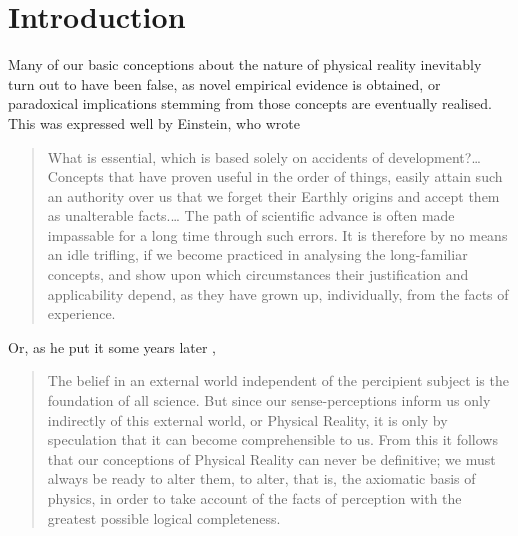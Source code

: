 \documentclass[11pt]{article}
\begin{document}
\section{Introduction \label{sec_I}}
Many of our basic conceptions about the nature of physical reality inevitably turn out to have been false, as novel empirical evidence is obtained, or paradoxical implications stemming from those concepts are eventually realised. This was expressed well by Einstein, who wrote \cite{Einstein1916}
\begin{quotation}
What is essential, which is based solely on accidents of development?\ldots Concepts that have proven useful in the order of things, easily attain such an authority over us that we forget their Earthly origins and accept them as unalterable facts.\ldots %
The path of scientific advance is often made impassable for a long time through such errors. It is therefore by no means an idle trifling, if we become practiced in analysing the long-familiar concepts, and show upon which circumstances their justification and applicability depend, as they have grown up, individually, from the facts of experience. %

\end{quotation}
Or, as he put it some years later \cite{Einstein1931},
\begin{quotation}
The belief in an external world independent of the percipient subject is the foundation of all science. But since our sense-perceptions inform us only indirectly of this external world, or Physical Reality, it is only by speculation that it can become comprehensible to us. From this it follows that our conceptions of Physical Reality can never be definitive; we must always be ready to alter them, to alter, that is, the axiomatic basis of physics, in order to take account of the facts of perception with the greatest possible logical completeness.
\end{quotation}
\end{document}
